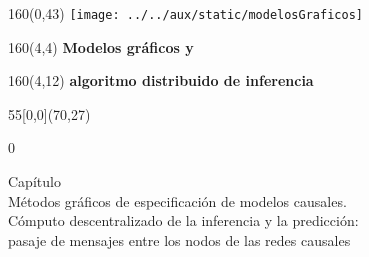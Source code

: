 \documentclass[shownotes,aspectratio=169]{beamer}
\newcounter{capitulo}
\newcommand{\unidad}{\thecapitulo \stepcounter{capitulo}}
\begin{document}
\begin{frame}
\begin{textblock}{160}(0,43)
\texttt{[image: ../../aux/static/modelosGraficos]}
\end{textblock}


\begin{textblock}{160}(4,4)
\LARGE \textcolor{black!85}{\fontsize{22}{0}\selectfont \textbf{Modelos gráficos y}}
\end{textblock}
\begin{textblock}{160}(4,12)
\LARGE \textcolor{black!85}{\fontsize{22}{0}\selectfont \textbf{algoritmo distribuido de inferencia}}
\end{textblock}


\begin{textblock}{55}[0,0](70,27)
\begin{turn}{0}
\parbox{10cm}{\sloppy\setlength\parfillskip{0pt}
\textcolor{black!85}{Capítulo \unidad} \\
\small\textcolor{black!85}{Métodos gráficos de especificación de modelos causales.} \\
\small\textcolor{black!85}{Cómputo descentralizado de la inferencia y la predicción:} \\
\small\textcolor{black!85}{pasaje de mensajes entre los nodos de las redes causales}\\
}
\end{turn}
\end{textblock}

\end{frame}
\end{document}
